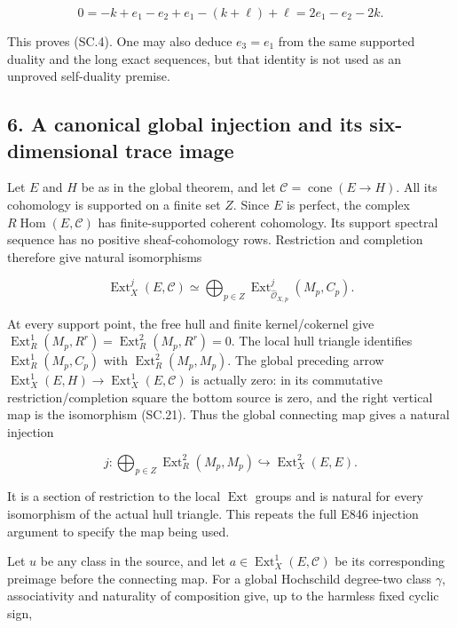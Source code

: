 \[
 0=-k+e_1-e_2+e_1-(k+\ell)+\ell
    =2e_1-e_2-2k.
 \tag{SC.20}
\]

This proves (SC.4). One may also deduce \(e_3=e_1\) from the same supported
duality and the long exact sequences, but that identity is not used as
an unproved self-duality premise.

\subsection{6. A canonical global injection and its six-dimensional trace image}\label{SF-E847:s6}

Let \(E\) and \(H\) be as in the global theorem, and let \(\mathcal C=\operatorname{cone}(E\to H)\).
All its cohomology is supported on a finite set \(Z\). Since \(E\) is perfect,
the complex \(R\operatorname{Hom}(E,\mathcal C)\) has finite-supported coherent cohomology.
Its support spectral sequence has no positive sheaf-cohomology rows.
Restriction and completion therefore give natural isomorphisms

\[
 \operatorname{Ext}^j_X(E,\mathcal C)
    \simeq\bigoplus_{p\in Z}
       \operatorname{Ext}^j_{\widehat{\mathcal O}_{X,p}}(M_p,C_p).
 \tag{SC.21}
\]

At every support point, the free hull and finite kernel/cokernel give
\(\operatorname{Ext}^1_R(M_p,R^r)=\operatorname{Ext}^2_R(M_p,R^r)=0\). The local hull triangle identifies
\(\operatorname{Ext}^1_R(M_p,C_p)\) with \(\operatorname{Ext}^2_R(M_p,M_p)\). The global preceding arrow
\(\operatorname{Ext}^1_X(E,H)\to\operatorname{Ext}^1_X(E,\mathcal C)\) is actually zero: in its commutative
restriction/completion square the bottom source is zero, and the
right vertical map is the isomorphism (SC.21). Thus the global
connecting map gives a natural injection

\[
 j:\bigoplus_{p\in Z}\operatorname{Ext}^2_R(M_p,M_p)
       \hookrightarrow\operatorname{Ext}^2_X(E,E).
 \tag{SC.22}
\]

It is a section of restriction to the local \(\operatorname{Ext}\) groups and is natural
for every isomorphism of the actual hull triangle. This repeats the
full E846 injection argument to specify the map being used.

Let \(u\) be any class in the source, and let \(a\in\operatorname{Ext}^1_X(E,\mathcal C)\)
be its corresponding preimage before the connecting map. For a global
Hochschild degree-two class \(\gamma\), associativity and naturality of
composition give, up to the harmless fixed cyclic sign,

